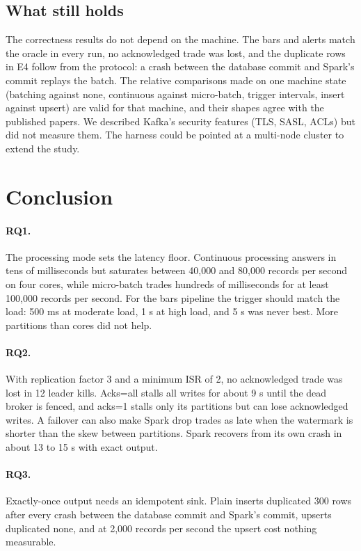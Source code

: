 \subsection{What still holds}
The correctness results do not depend on the machine. The bars and alerts match the oracle in every run,
no acknowledged trade was lost, and the duplicate rows in E4 follow from the protocol: a crash between
the database commit and Spark's commit replays the batch. The relative comparisons made on one machine
state (batching against none, continuous against micro-batch, trigger intervals, insert against upsert)
are valid for that machine, and their shapes agree with the published papers. We described Kafka's
security features (TLS, SASL, ACLs) but did not measure them. The harness could be pointed at a
multi-node cluster to extend the study.

\section{Conclusion}
\paragraph{RQ1.} The processing mode sets the latency floor. Continuous processing answers in tens of
milliseconds but saturates between 40,000 and 80,000 records per second on four cores, while micro-batch
trades hundreds of milliseconds for at least 100,000 records per second. For the bars pipeline the
trigger should match the load: 500 ms at moderate load, 1 s at high load, and 5 s was never best. More
partitions than cores did not help.

\paragraph{RQ2.} With replication factor 3 and a minimum ISR of 2, no acknowledged trade was lost in 12
leader kills. Acks=all stalls all writes for about 9 s until the dead broker is fenced, and acks=1 stalls
only its partitions but can lose acknowledged writes. A failover can also make Spark drop trades as late
when the watermark is shorter than the skew between partitions. Spark recovers from its own crash in
about 13 to 15 s with exact output.

\paragraph{RQ3.} Exactly-once output needs an idempotent sink. Plain inserts duplicated 300 rows after
every crash between the database commit and Spark's commit, upserts duplicated none, and at 2,000 records
per second the upsert cost nothing measurable.


